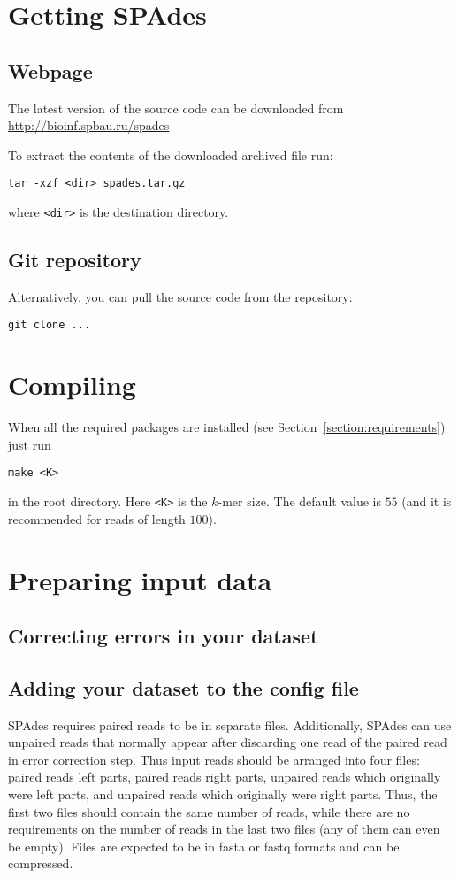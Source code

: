 \documentclass{article}
\def\spades{SPAdes}
\begin{document}
\section{Getting {\spades}}
\subsection{Webpage}
The latest version of the source code can be downloaded from\\
\url{http://bioinf.spbau.ru/spades}

To extract the contents of the downloaded archived file run:
\begin{lstlisting}
tar -xzf <dir> spades.tar.gz
\end{lstlisting}
where {\tt <dir>} is the destination directory.

\subsection{Git repository}
Alternatively, you can pull the source code from the 
repository:
\begin{lstlisting}
git clone ...
\end{lstlisting}


\section{Compiling}
When all the required packages are installed (see 
Section~\ref{section:requirements})
just run
\begin{lstlisting}
make <K>
\end{lstlisting}
in the root directory. Here {\tt <K>} is the $k$-mer size.
The default value is $55$ (and it is recommended for reads of length $100$).

\section{Preparing input data}
\subsection{Correcting errors in your dataset}

\subsection{Adding your dataset to the config file}
{\spades} requires paired reads to be in separate files.
Additionally, {\spades} can use unpaired reads that normally appear after discarding one read of the paired read in error correction step.
Thus input reads should be arranged into four files: paired reads left parts, paired reads right parts, unpaired reads which originally were left parts, and
unpaired reads which originally were right parts. Thus, the first two files should contain the same number of reads, while
there are no requirements on the number of reads in the last two files (any of them can even be empty).
Files are expected to be in fasta or fastq formats and can be compressed.
\end{document}
